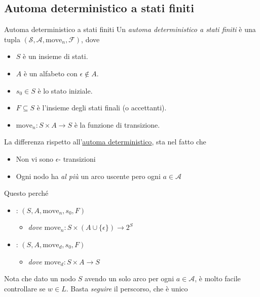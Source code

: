 \subsection{Automa deterministico a stati finiti}
\begin{definizione}{Automa deterministico a stati finiti}
	Un \textit{automa deterministico a stati finiti} è una tupla $ \left(\mathcal{S}, \mathcal{A}, \text{move}_n, \mathcal{F}\right) $, dove
	\begin{itemize}
		\item $S$ è un insieme di stati.
		\item $A$ è un alfabeto con $\epsilon \notin A$.
		\item $s_0 \in S$ è lo stato iniziale.
		\item $F \subseteq S$ è l'insieme degli stati finali (o accettanti).
		\item $\text{move}_n : S \times A  \to S$ è la funzione di transizione.
	\end{itemize}
\end{definizione}
La differenza rispetto all'\hyperref[nondeterministic automata]{automa deterministico}, sta nel fatto che
\begin{itemize}
	\item Non vi sono $ \epsilon  $- transizioni
	\item Ogni nodo ha \textit{al più} un arco uscente pero ogni $ a \in \mathcal{A} $
\end{itemize}
Questo perché
\begin{itemize}
	\item {}: $(S, A, \text{move}_n, s_0, F)$
	      \begin{itemize}
		      \item[] \textit{dove} $\text{move}_n : S \times (A \cup \{\epsilon\}) \to 2^S$
	      \end{itemize}

	\item {}: $(S, A, \text{move}_d, s_0, F)$
	      \begin{itemize}
		      \item[] \textit{dove} $\text{move}_d : S \times A \to S$
	      \end{itemize}
\end{itemize}
Nota che dato un nodo $ S $ avendo un solo arco per ogni $ a \in \mathcal{A} $, è molto facile controllare se $ w \in L $. Basta \textit{seguire} il perscorso, che è unico
